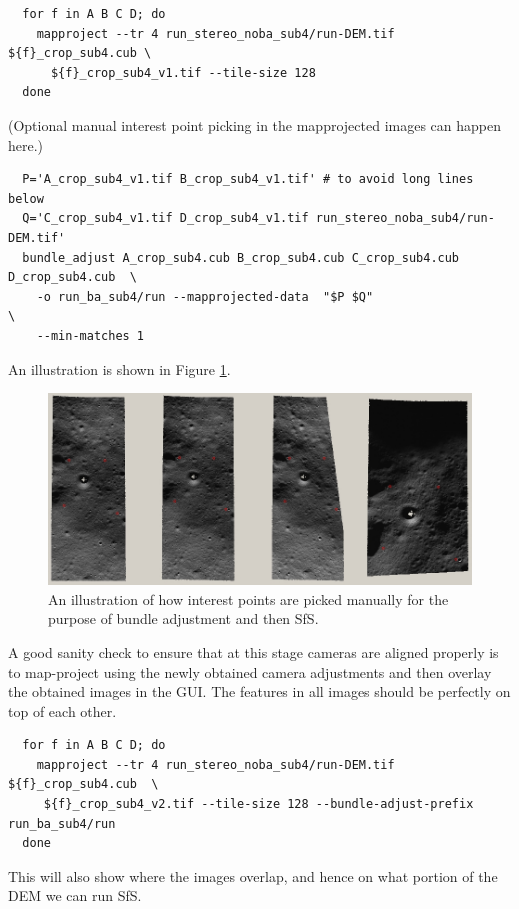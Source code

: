 \begin{verbatim}
  for f in A B C D; do 
    mapproject --tr 4 run_stereo_noba_sub4/run-DEM.tif ${f}_crop_sub4.cub \
      ${f}_crop_sub4_v1.tif --tile-size 128
  done
\end{verbatim}

(Optional manual interest point picking in the mapprojected images can happen here.)

\begin{verbatim}
  P='A_crop_sub4_v1.tif B_crop_sub4_v1.tif' # to avoid long lines below
  Q='C_crop_sub4_v1.tif D_crop_sub4_v1.tif run_stereo_noba_sub4/run-DEM.tif'
  bundle_adjust A_crop_sub4.cub B_crop_sub4.cub C_crop_sub4.cub D_crop_sub4.cub  \
    -o run_ba_sub4/run --mapprojected-data  "$P $Q"                              \
    --min-matches 1
\end{verbatim}

An illustration is shown in Figure \ref{fig:sfs3}.

\begin{figure}[t!]
\begin{center}
\includegraphics[width=7in]{images/sfs3.jpg}
\caption[sfs]{An illustration of how interest points are picked manually for the purpose of bundle adjustment and then SfS.}
\label{fig:sfs3}
\end{center}
\end{figure}

A good sanity check to ensure that at this stage cameras are aligned
properly is to map-project using the newly obtained camera adjustments
and then overlay the obtained images in the GUI.  The features in all
images should be perfectly on top of each other.
\begin{verbatim}
  for f in A B C D; do 
    mapproject --tr 4 run_stereo_noba_sub4/run-DEM.tif ${f}_crop_sub4.cub  \
     ${f}_crop_sub4_v2.tif --tile-size 128 --bundle-adjust-prefix run_ba_sub4/run
  done
\end{verbatim}
This will also show where the images overlap, and hence on what portion of the DEM we
can run SfS.

